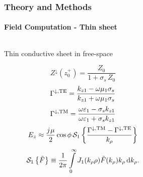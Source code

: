 \documentclass[mathserif,16pt,xcolor=table]{beamer}
\begin{document}
%         
\begin{frame}
  \frametitle{Theory and Methods}
  \framesubtitle{Field Computation - Thin sheet}
  \begin{columns}[T] %
    \begin{column}{.65\textwidth}
      \begin{outline}[itemize]
        \1 Thin conductive sheet in free-space
      \end{outline}
      \begin{equation} \nonumber
        Z^{\downarrow}(z_0^+) = \frac{Z_0}{ 1 + \sigma_s \, Z_0}
      \end{equation}
      \begin{equation} \nonumber
        \Gamma^{\downarrow, \mathrm{TE}} = \frac{k_{z1} - \omega \mu_1 \sigma_s }{k_{z1} + \omega \mu_1 \sigma_s}
      \end{equation}
      \begin{equation} \nonumber
        \Gamma^{\downarrow, \mathrm{TM}} = \frac{ \omega \varepsilon_1 -\sigma_s k_{z1} }{\omega \varepsilon_1 + \sigma_s k_{z1}}
      \end{equation}
      \begin{equation} \nonumber
        E_z \approx \frac{{j}\mkern1mu \mu}{2} \cos \phi \, \mathcal{S}_1 \left \{ \frac{\Gamma^{\downarrow, \mathrm{TM}} - \Gamma^{\downarrow, \mathrm{TE}}}{ k_{\rho}} \right \}
        \label{eq:somm_Gzx}
      \end{equation}
      \begin{equation} \nonumber
          \mathcal{S}_1\left \{\ti{F}\right \} \equiv \frac{1}{2\pi}\int\limits_0^{\inf} J_1(k_{\p}\p)  \ti{F}(k_{\p}) k_{\p} \diff{k_{\p}}.
        \label{eq:generalized_SI}%
      \end{equation}
    \end{column}
    \begin{column}[T]{.5\textwidth}
      \begin{figure}
        \centering \vspace*{-1.5cm} \hspace*{-1cm}
        \fontsize{6}{7}\selectfont
        \def\svgwidth{.5\linewidth}
        
      \end{figure}
    \end{column}
  \end{columns}
\end{frame}
\end{document}
